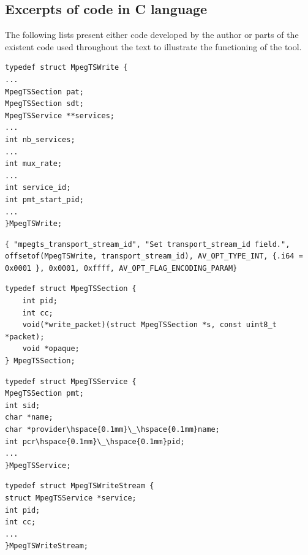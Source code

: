 \documentclass[
	12pt,				%
	openright,			%
	twoside,			%
	a4paper,			%
	brazil,
	french,				%
	english
	]{abntex2}
\begin{document}
\begin{apendicesenv}
\chapter{Excerpts of code in C language}

The following lists present either code developed by the author or parts of the existent code used throughout the text to illustrate the functioning of the tool.

\begin{lstlisting}[caption={Excerpt of MpegTSWrite structure}, label=lst_MpegTSWrite]
typedef struct MpegTSWrite {
...
MpegTSSection pat;
MpegTSSection sdt;
MpegTSService **services;
...
int nb_services;
...
int mux_rate;
...
int service_id;
int pmt_start_pid;
...
}MpegTSWrite;
\end{lstlisting}

\begin{lstlisting}[caption={Example of input option}, label=lst_input_option]
{ "mpegts_transport_stream_id", "Set transport_stream_id field.", offsetof(MpegTSWrite, transport_stream_id), AV_OPT_TYPE_INT, {.i64 = 0x0001 }, 0x0001, 0xffff, AV_OPT_FLAG_ENCODING_PARAM}
\end{lstlisting}

\begin{lstlisting}[caption={Excerpt of MpegTSSection structure}, label=lst_MpegTSSection]
typedef struct MpegTSSection {
	int pid;
	int cc;
	void(*write_packet)(struct MpegTSSection *s, const uint8_t *packet);
	void *opaque;
} MpegTSSection;
\end{lstlisting}

\begin{lstlisting}[caption={Excerpt of MpegTSService structure}, label=lst_MpegTSService]
typedef struct MpegTSService {
MpegTSSection pmt; 
int sid; 
char *name;
char *provider\hspace{0.1mm}\_\hspace{0.1mm}name;
int pcr\hspace{0.1mm}\_\hspace{0.1mm}pid;
...
}MpegTSService;
\end{lstlisting}

\begin{lstlisting}[caption={Excerpt of MpegTSWriteStream structure}, label=lst_MpegTSWriteStream]
typedef struct MpegTSWriteStream {
struct MpegTSService *service;
int pid;
int cc;
...
}MpegTSWriteStream;
\end{lstlisting}


\end{apendicesenv}
\end{document}
